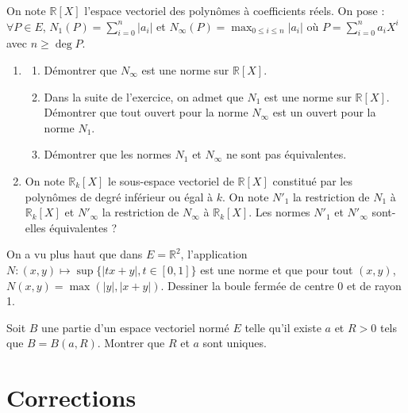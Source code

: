 \begin{exercice}
On note $\mathbb{R}[X]$ l'espace vectoriel des polynômes à coefficients réels.
On pose : $\forall P \in E$, $N_1(P) = \sum_{i=0}^n |a_i|$ et $N_\infty(P) = \max_{0 \le i \le n} |a_i|$ où $P = \sum_{i=0}^n a_i X^i$ avec $n \ge \deg P$.
\begin{enumerate}
    \item 
    \begin{enumerate}
        \item Démontrer que $N_\infty$ est une norme sur $\mathbb{R}[X]$.
        \item Dans la suite de l'exercice, on admet que $N_1$ est une norme sur $\mathbb{R}[X]$. Démontrer que tout ouvert pour la norme $N_\infty$ est un ouvert pour la norme $N_1$.
        \item Démontrer que les normes $N_1$ et $N_\infty$ ne sont pas équivalentes.
    \end{enumerate}
    \item On note $\mathbb{R}_k[X]$ le sous-espace vectoriel de $\mathbb{R}[X]$ constitué par les polynômes de degré inférieur ou égal à $k$. On note $N'_1$ la restriction de $N_1$ à $\mathbb{R}_k[X]$ et $N'_\infty$ la restriction de $N_\infty$ à $\mathbb{R}_k[X]$.
    Les normes $N'_1$ et $N'_\infty$ sont-elles équivalentes ?
\end{enumerate}
\end{exercice}

\begin{exercice}
On a vu plus haut que dans $E = \mathbb{R}^2$, l'application $N : (x,y) \mapsto \sup \{ |tx+y|, t \in [0,1] \}$ est une norme et que pour tout $(x,y)$, $N(x,y) = \max(|y|, |x+y|)$. Dessiner la boule fermée de centre 0 et de rayon 1.
\end{exercice}

\begin{exercice}
Soit $B$ une partie d'un espace vectoriel normé $E$ telle qu'il existe $a$ et $R > 0$ tels que $B = B(a,R)$. Montrer que $R$ et $a$ sont uniques.
\end{exercice}

\newpage
\section{Corrections}

